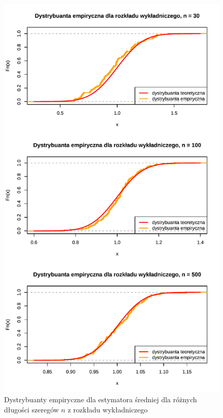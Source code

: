 \documentclass[10pt, a4paper]{article}\usepackage[]{graphicx}\usepackage[]{xcolor}
\makeatletter
\def\maxwidth{ %
  \ifdim\Gin@nat@width>\linewidth
    \linewidth
  \else
    \Gin@nat@width
  \fi
}
\newenvironment{knitrout}{}{} %
\makeatother
\begin{document}
\begin{knitrout}
\color{fgcolor}\begin{figure}[H]

{\centering \includegraphics[width=\maxwidth]{figure/analiza-sredniej-exp-dystr-emp-1} 

}

\caption[Dystrybuanty empiryczne dla estymatora średniej dla różnych długości szeregów $n$ z rozkładu wykładniczego]{Dystrybuanty empiryczne dla estymatora średniej dla różnych długości szeregów $n$ z rozkładu wykładniczego}\label{fig:analiza-sredniej-exp-dystr-emp}
\end{figure}

\end{knitrout}
\end{document}
